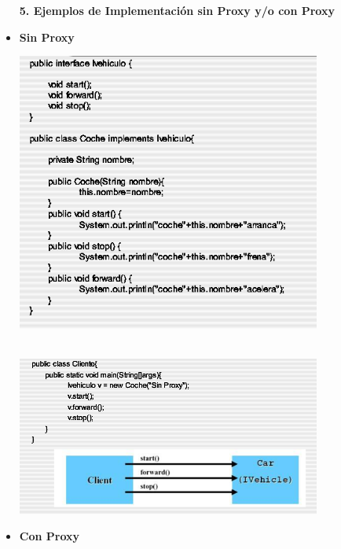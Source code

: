 \begin{flushleft}
\begin{itemize}
\textbf {5.	Ejemplos de Implementación sin Proxy y/o con Proxy}

\item	\textbf {Sin Proxy}

\begin{center}

	\includegraphics[width=10cm]{./Imagenes/proxy4} 
	\end{center}
\begin{center}
\textbf{}\\
	\includegraphics[width=10cm]{./Imagenes/proxy5} 
	\end{center}


\item	\textbf {Con Proxy}

\begin{center}


\end{center}
\end{itemize}
\end{flushleft}
